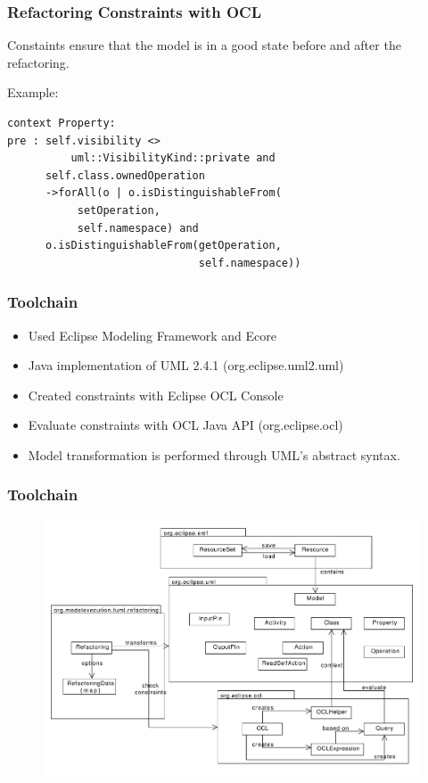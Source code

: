\documentclass{beamer}
\begin{document}
        
\begin{frame}[fragile]
\frametitle{Refactoring Constraints with OCL}
Constaints ensure that the model is in a good state
before and after the refactoring.

Example:
\begin{lstlisting}[morekeywords={self,forAll,uml,VisibilityKind,o}]
context Property:
pre : self.visibility <> 
          uml::VisibilityKind::private and 
      self.class.ownedOperation
      ->forAll(o | o.isDistinguishableFrom(
           setOperation, 
           self.namespace) and
      o.isDistinguishableFrom(getOperation,
                              self.namespace))
\end{lstlisting}

\end{frame}
        
\begin{frame}
\frametitle{Toolchain}
\begin{itemize}
 \item Used Eclipse Modeling Framework and Ecore
 \item Java implementation of UML 2.4.1 (org.eclipse.uml2.uml)
 \item Created constraints with Eclipse OCL Console
 \item Evaluate constraints with OCL Java API (org.eclipse.ocl)
 \item Model transformation is performed through UML's abstract syntax.
\end{itemize}
\end{frame}

\begin{frame}
\frametitle{Toolchain}
 \begin{figure}[h!t]
 \centering
 \includegraphics[scale=0.35]{figures/Toolchain2}
\end{figure}
\end{frame}
\end{document}
